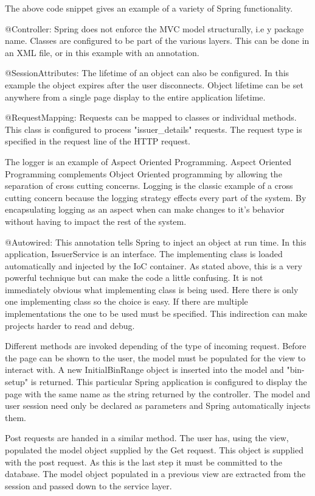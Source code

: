 \documentclass[a4paper, 11pt, titlepage]{article}
\begin{document}
The above code snippet gives an example of a variety of Spring functionality. 

@Controller: Spring does not enforce the MVC model structurally, i.e y package name. Classes are configured to be part of the various layers. This can be done in an XML file, or in this example with an annotation. 

@SessionAttributes: The lifetime of an object can also be configured. In this example the object expires after the user disconnects. Object lifetime can be set anywhere from a single page display to the entire application lifetime.

@RequestMapping: Requests can be mapped to classes or individual methods. This class is configured to process "issuer_details" requests. The request type is specified in the request line of the HTTP request.

The logger is an example of Aspect Oriented Programming. Aspect Oriented Programming complements Object Oriented programming by allowing the separation of cross cutting concerns. Logging is the classic example of a cross cutting concern because the logging strategy effects every part of the system. By encapsulating logging as an aspect when can make changes to it's behavior without having to impact the rest of the system.
\cite{https://www.cs.washington.edu/education/courses/503/08wi/aop-ecoop-1997.pdf}

@Autowired: This annotation tells Spring to inject an object at run time. In this application, IssuerService is an interface. The implementing class is loaded automatically and injected by the IoC container. As stated above, this is a very powerful technique but can make the code a little confusing. It is not immediately obvious what implementing class is being used. Here there is only one implementing class so the choice is easy. If there are multiple implementations the one to be used must be specified. This indirection can make projects harder to read and debug.

Different methods are invoked depending of the type of incoming request. Before the page can be shown to the user, the model must be populated for the view to interact with. A new InitialBinRange object is inserted into the model and "bin-setup" is returned. This particular Spring application is configured to display the page with the same name as the string returned by the controller. The model and user session need only be declared as parameters and Spring automatically injects them.

Post requests are handed in a similar method. The user has, using the view, populated the model object supplied by the Get request. This object is supplied with the post request. As this is the last step it must be committed to the database. The model object populated in a previous view are extracted from the session and passed down to the service layer. 
\end{document}
